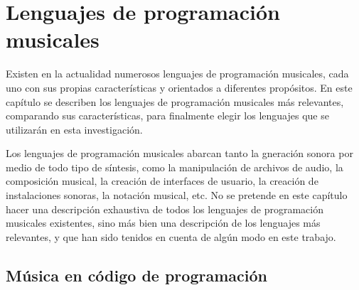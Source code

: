 


\chapter{Lenguajes de programación musicales}

Existen en la actualidad numerosos lenguajes de programación musicales, cada uno con sus propias características y orientados a diferentes propósitos. En este capítulo se describen los lenguajes de programación musicales más relevantes, comparando sus características, para finalmente elegir los lenguajes que se utilizarán en esta investigación.

Los lenguajes de programación musicales abarcan tanto la gneración sonora por medio de todo tipo de síntesis, como la manipulación de archivos de audio, la composición musical, la creación de interfaces de usuario, la creación de instalaciones sonoras, la notación musical, etc. No se pretende en este capítulo hacer una descripción exhaustiva de todos los lenguajes de programación musicales existentes, sino más bien una descripción de los lenguajes más relevantes, y que han sido tenidos en cuenta de algún modo en este trabajo. 

\section{Música en código de programación}

